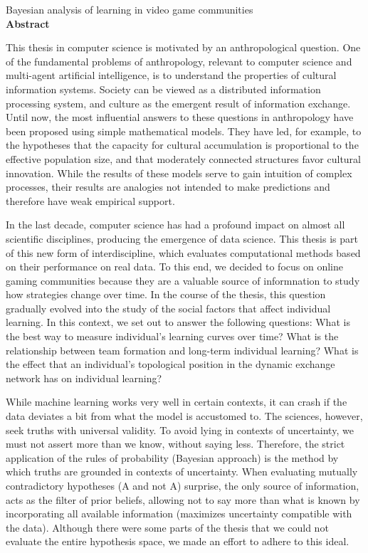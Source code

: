 \documentclass[a4paper,11pt]{book}
\theoremstyle{definition}
\newcommand{\TITULOen}[0]{Bayesian analysis of learning in video game communities}
\begin{document}
\newpage


\begin{center}
\Large \TITULOen \normalsize \\[0.5cm]

\textbf{Abstract}
\end{center}


This thesis in computer science is motivated by an anthropological question.
One of the fundamental problems of anthropology, relevant to computer science and multi-agent artificial intelligence, is to understand the properties of cultural information systems.
Society can be viewed as a distributed information processing system, and culture as the emergent result of information exchange.
Until now, the most influential answers to these questions in anthropology have been proposed using simple mathematical models.
They have led, for example, to the hypotheses that the capacity for cultural accumulation is proportional to the effective population size, and that moderately connected structures favor cultural innovation.
While the results of these models serve to gain intuition of complex processes, their results are analogies not intended to make predictions and therefore have weak empirical support.


In the last decade, computer science has had a profound impact on almost all scientific disciplines, producing the emergence of data science.
This thesis is part of this new form of interdiscipline, which evaluates computational methods based on their performance on real data.
To this end, we decided to focus on online gaming communities because they are a valuable source of informnation to study how strategies change over time.
In the course of the thesis, this question gradually evolved into the study of the social factors that affect individual learning.
In this context, we set out to answer the following questions:
What is the best way to measure individual's learning curves over time?
What is the relationship between team formation and long-term individual learning?
What is the effect that an individual's topological position in the dynamic exchange network has on individual learning?


While machine learning works very well in certain contexts, it can crash if the data deviates a bit from what the model is accustomed to.
The sciences, however, seek truths with universal validity.
To avoid lying in contexts of uncertainty, we must not assert more than we know, without saying less.
Therefore, the strict application of the rules of probability (Bayesian approach) is the method by which truths are grounded in contexts of uncertainty.
When evaluating mutually contradictory hypotheses (A and not A) surprise, the only source of information, acts as the filter of prior beliefs, allowing not to say more than what is known by incorporating all available information (maximizes uncertainty compatible with the data).
Although there were some parts of the thesis that we could not evaluate the entire hypothesis space, we made an effort to adhere to this ideal.
\end{document}
